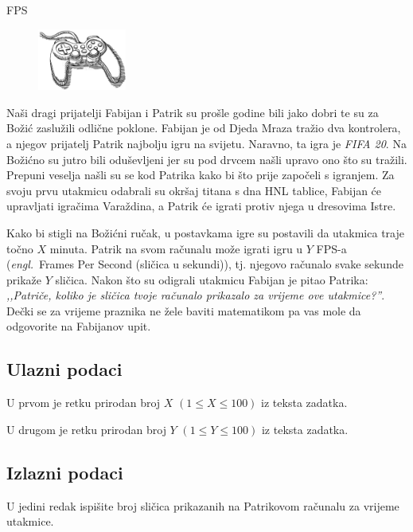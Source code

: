 \begin{statement}[
  problempoints=20,
  timelimit=1 sekunda,
  memorylimit=512 MiB,
]{FPS}

\setlength\intextsep{-0.1cm}
\begin{figure}
\centering
\includegraphics[width=0.26\textwidth]{img/fps.png}
\end{figure}

Naši dragi prijatelji Fabijan i Patrik su prošle godine bili jako dobri te su
za Božić zaslužili odlične poklone. Fabijan je od Djeda Mraza tražio dva
kontrolera, a njegov prijatelj Patrik najbolju igru na svijetu. Naravno, ta
igra je \textit{FIFA 20}. Na Božićno su jutro bili oduševljeni jer su pod
drvcem našli upravo ono što su tražili. Prepuni veselja našli su se kod
Patrika kako bi što prije započeli s igranjem. Za svoju prvu utakmicu
odabrali su okršaj titana s dna HNL tablice, Fabijan će upravljati igračima
Varaždina, a Patrik će igrati protiv njega u dresovima Istre.

Kako bi stigli na Božićni ručak, u postavkama igre su postavili da utakmica
traje točno $X$ minuta. Patrik na svom računalu može igrati igru u $Y$
FPS-a (\textit{engl.}\ Frames Per Second (sličica u sekundi)), tj. njegovo
računalo svake sekunde prikaže $Y$ sličica. Nakon što su odigrali utakmicu
  Fabijan je pitao Patrika: \textit{,,Patriče, koliko je sličica tvoje računalo
  prikazalo za vrijeme ove utakmice?''}. Dečki se za vrijeme praznika ne žele
baviti matematikom pa vas mole da odgovorite na Fabijanov upit.


\subsection*{Ulazni podaci}
U prvom je retku prirodan broj $X$ $(1 \le X \le 100)$ iz teksta zadatka.

U drugom je retku prirodan broj $Y$ $(1 \le Y \le 100)$ iz teksta zadatka.

\subsection*{Izlazni podaci}
U jedini redak ispišite broj sličica prikazanih na Patrikovom računalu za
vrijeme utakmice.


\end{statement}
